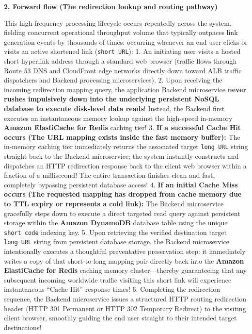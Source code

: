 \vspace{0.5em}\noindent\textbf{2. Forward flow (The redirection lookup and routing
pathway)}\par

This high-frequency processing lifecycle occurs repeatedly across the
system, fielding concurrent operational throughput volume that typically
outpaces link generation events by thousands of times: occurring
whenever an end user clicks or visits an active shortened link
(\texttt{short\ URL}): 1. An initiating user visits a hosted short
hyperlink address through a standard web browser (traffic flows through
Route 53 DNS and CloudFront edge networks directly down toward ALB
traffic dispatchers and Backend processing microservices). 2. Upon
receiving the incoming redirection mapping query, the application
Backend microservice \textbf{never rushes impulsively down into the
underlying persistent NoSQL database to execute disk-level data reads}!
Instead, the Backend first executes an instantaneous memory lookup
against the high-speed in-memory \textbf{Amazon ElastiCache for Redis}
caching tier! 3. \textbf{If a successful Cache Hit occurs (The URL
mapping exists inside the fast memory buffer):} The in-memory caching
tier immediately returns the associated target \texttt{long\ URL} string
straight back to the Backend microservice; the system instantly
constructs and dispatches an HTTP redirection response back to the
client web browser within a fraction of a millisecond! The entire
transaction finishes clean and fast, completely bypassing persistent
database access! 4. \textbf{If an initial Cache Miss occurs (The
requested mapping has dropped from cache memory due to TTL expiry or
represents a cold link):} The Backend microservice gracefully steps down
to execute a direct targeted read query against persistent storage
within the \textbf{Amazon DynamoDB} database table using the unique
\texttt{short\ code} indexing key. 5. Upon retrieving the verified
destination target \texttt{long\ URL} string from persistent database
storage, the Backend microservice intentionally executes a thoughtful
preventative preservation step: it immediately writes a copy of that
short-to-long mapping pair directly back into the \textbf{Amazon
ElastiCache for Redis} caching memory cluster---thereby guaranteeing
that any subsequent incoming worldwide traffic visiting this short link
will experience instantaneous ``Cache Hit'' response times! 6.
Completing the redirection sequence, the Backend microservice issues a
structured HTTP routing redirection header (HTTP 301 Permanent or HTTP
302 Temporary Redirect) to the visiting client browser, smoothly guiding
the end user straight to their intended target destinations!

